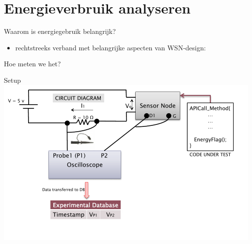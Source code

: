 \documentclass[presentation, bigger]{beamer}
\begin{document}
\section{Energieverbruik analyseren}
\label{sec-3}

\begin{frame}[label=sec-3-1]{Waarom is energiegebruik belangrijk?}
\begin{itemize}
\item rechtstreeks verband met belangrijke aspecten van WSN-design:
\end{itemize}
\end{frame}

\begin{frame}[label=sec-3-2]{Hoe meten we het?}
\begin{minipage}{\textwidth}
\centering
{} 
\end{minipage}
\end{frame}

\begin{frame}[label=sec-3-3]{Setup}
\includegraphics[width=\textwidth,keepaspectration=true]{elek/diag1}
\end{frame}
\end{document}
